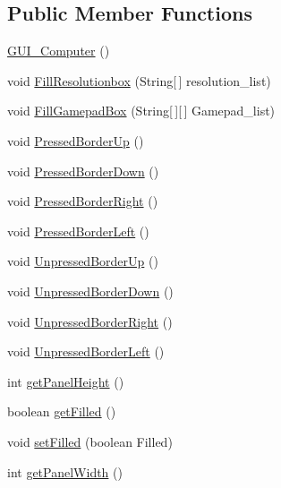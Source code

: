 \subsection*{Public Member Functions}
\begin{DoxyCompactItemize}
\item 
\hyperlink{class_view_1_1_g_u_i___computer_a089622f615d826d0c2d80042dcca74f2}{G\+U\+I\+\_\+\+Computer} ()
\item 
void \hyperlink{class_view_1_1_g_u_i___computer_ae3988a7d523eae6f18c37c7e2c6453ca}{Fill\+Resolutionbox} (String\mbox{[}$\,$\mbox{]} resolution\+\_\+list)
\item 
void \hyperlink{class_view_1_1_g_u_i___computer_ac39d0dc5d225c2455a1bd434f1de456d}{Fill\+Gamepad\+Box} (String\mbox{[}$\,$\mbox{]}\mbox{[}$\,$\mbox{]} Gamepad\+\_\+list)
\item 
void \hyperlink{class_view_1_1_g_u_i___computer_a5d927483007284b36dc8ab4f91d4fabb}{Pressed\+Border\+Up} ()
\item 
void \hyperlink{class_view_1_1_g_u_i___computer_aaede673d6779f68f49548ea98a4c75be}{Pressed\+Border\+Down} ()
\item 
void \hyperlink{class_view_1_1_g_u_i___computer_a170b35742ba96d0755efaffe7ac07ed8}{Pressed\+Border\+Right} ()
\item 
void \hyperlink{class_view_1_1_g_u_i___computer_aefab445684ec44c4d25e79126047ee44}{Pressed\+Border\+Left} ()
\item 
void \hyperlink{class_view_1_1_g_u_i___computer_a4713f83dba2ecf7851e477b0471c2bd9}{Unpressed\+Border\+Up} ()
\item 
void \hyperlink{class_view_1_1_g_u_i___computer_ae91f9276949e3fdf137868c7b5598c2a}{Unpressed\+Border\+Down} ()
\item 
void \hyperlink{class_view_1_1_g_u_i___computer_a07748ab4638bcaffcc4800dcde89aea8}{Unpressed\+Border\+Right} ()
\item 
void \hyperlink{class_view_1_1_g_u_i___computer_a8e75fc6ce0d4a81076be7715786ecb61}{Unpressed\+Border\+Left} ()
\item 
int \hyperlink{class_view_1_1_g_u_i___computer_acc65644bbd63b984257392af1c123f2a}{get\+Panel\+Height} ()
\item 
boolean \hyperlink{class_view_1_1_g_u_i___computer_a5dad382c7f9afa1b4b52ebe3e8223236}{get\+Filled} ()
\item 
void \hyperlink{class_view_1_1_g_u_i___computer_a6aa4304d849922f381fe8f96eb7c9467}{set\+Filled} (boolean Filled)
\item 
int \hyperlink{class_view_1_1_g_u_i___computer_af6e98e4974fbe508ef9e9914b812d25b}{get\+Panel\+Width} ()
\end{DoxyCompactItemize}
